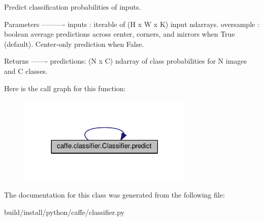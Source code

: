 \begin{DoxyVerb}Predict classification probabilities of inputs.

Parameters
----------
inputs : iterable of (H x W x K) input ndarrays.
oversample : boolean
    average predictions across center, corners, and mirrors
    when True (default). Center-only prediction when False.

Returns
-------
predictions: (N x C) ndarray of class probabilities for N images and C
    classes.
\end{DoxyVerb}
 Here is the call graph for this function\+:
\nopagebreak
\begin{figure}[H]
\begin{center}
\leavevmode
\includegraphics[width=237pt]{classcaffe_1_1classifier_1_1_classifier_a8d1d898b351cc84cd9f12ce10401312d_cgraph}
\end{center}
\end{figure}


The documentation for this class was generated from the following file\+:\begin{DoxyCompactItemize}
\item 
build/install/python/caffe/classifier.\+py\end{DoxyCompactItemize}
